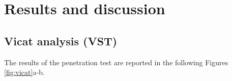 \documentclass[a4paper, 11pt]{article}
\begin{document}
\newpage

\section{Results and discussion}

\subsection{Vicat analysis (VST)}

The results of the penetration test are reported in the following Figures \ref{fig:vicat}a-b.

\begin{figure}[htp]
	\centering
	\qquad
	\subfloat[][]

\end{figure}
\end{document}
